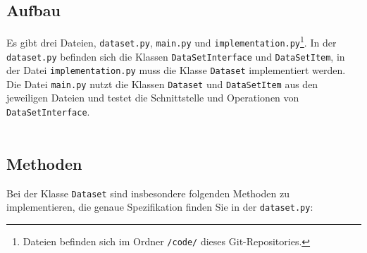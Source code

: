 \documentclass[a4paper]{article}
\begin{document}
\subsection{Aufbau}
Es gibt drei Dateien, \verb|dataset.py|, \verb|main.py| und \verb|implementation.py|\footnote{Dateien befinden sich im Ordner \texttt{/code/} dieses Git-Repositories.}.
In der \verb|dataset.py| befinden sich die Klassen \verb|DataSetInterface| und \verb|DataSetItem|,
in der Datei \verb|implementation.py| muss die Klasse \verb|Dataset| implementiert werden.
Die Datei \verb|main.py| nutzt die Klassen \verb|Dataset| und \verb|DataSetItem| aus den jeweiligen Dateien und testet die Schnittstelle und Operationen von \verb|DataSetInterface|.\\
\\

\subsection{Methoden}

Bei der Klasse \verb|Dataset| sind insbesondere folgenden Methoden zu implementieren, die genaue Spezifikation finden Sie in der \verb|dataset.py|:
\end{document}
